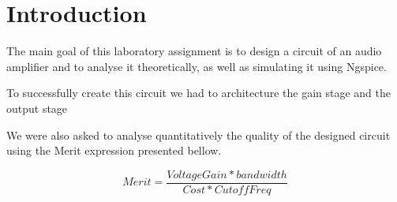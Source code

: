 \section{Introduction}
\label{Introduction}

\par The main goal of this laboratory assignment is to design a circuit of an audio amplifier and to analyse it theoretically, as well as simulating it using Ngspice.
\par To successfully create this circuit we had to architecture the gain stage and the output stage
\par We were also asked to analyse quantitatively the quality of the designed circuit using the Merit expression presented bellow. 

\begin {equation}
	Merit = \frac{VoltageGain*bandwidth}{Cost*CutoffFreq}
	\label{costofmerit}
\end{equation}
